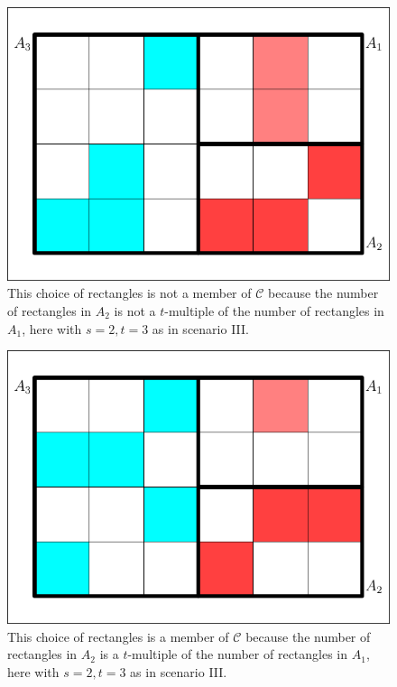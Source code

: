 \documentclass[12pt]{article}
\def\lwv{.6}
\begin{document}
\begin{figure}[h]
  \begin{flushright}
    \begin{minipage}[h]{\lwv\linewidth}
      \includegraphics[width=\textwidth]{partition-2.pdf}
      \caption{This choice of rectangles is not a member of
        $\mathcal{C}$ because the number of rectangles in $A_{2}$ is
        not a $t$-multiple of the number of rectangles in $A_{1}$,
        here with $s=2,t=3$ as in scenario III.}
      \label{fig:pwstex1}
    \end{minipage}
  \end{flushright}
\end{figure}

\begin{figure}[h]
  \begin{flushright}
    \begin{minipage}[h]{\lwv\linewidth}
      \includegraphics[width=\textwidth]{partition-1.pdf}
      \caption{This choice of rectangles is a member of
        $\mathcal{C}$ because the number of rectangles in $A_{2}$ is
        a $t$-multiple of the number of rectangles in $A_{1}$,
        here with $s=2,t=3$ as in scenario III.}
      \label{fig:pwstex2}
    \end{minipage}
  \end{flushright}
\end{figure}
\end{document}
